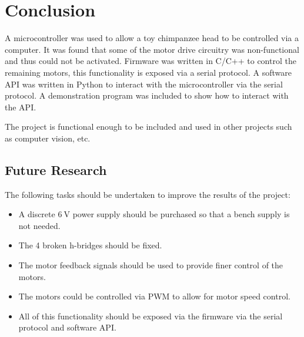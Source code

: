 \documentclass[12pt]{article} %
\begin{document}
\section{Conclusion}

A microcontroller was used to allow a toy chimpanzee head to be controlled via a computer.
It was found that some of the motor drive circuitry was non-functional and thus could not be activated.
Firmware was written in C/C++ to control the remaining motors, this functionality is exposed via a serial protocol.
A software API was written in Python to interact with the microcontroller via the serial protocol.
A demonstration program was included to show how to interact with the API.

The project is functional enough to be included and used in other projects such as computer vision, etc.

\subsection{Future Research}

The following tasks should be undertaken to improve the results of the project:
\begin{itemize}
	\item A discrete $\SI{6}{\volt}$ power supply should be purchased so that a bench supply is not needed.
	\item The 4 broken h-bridges should be fixed.
	\item The motor feedback signals should be used to provide finer control of the motors.
	\item The motors could be controlled via PWM to allow for motor speed control.
	\item All of this functionality should be exposed via the firmware via the serial protocol and software API.
\end{itemize}
\end{document}
